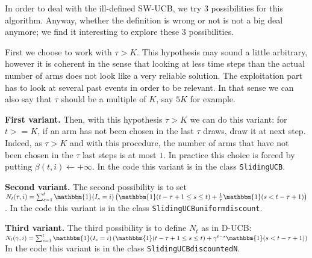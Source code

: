 In order to deal with the ill-defined SW-UCB, we try $3$ possibilities for this algorithm. Anyway, whether the definition is wrong or not is not a big deal anymore; we find it interesting to explore these $3$ possibilities.

First we choose to work with $\tau > K$. This hypothesis may sound a little arbitrary, however it is coherent in the sense that looking at less time steps than the actual number of arms does not look like a very reliable solution. The exploitation part has to look at several past events in order to be relevant. In that sense we can also say that $\tau$ should be a multiple of $K$, say $5K$ for example. 

\textbf{First variant.} Then, with this hypothesis $\tau > K$ we can do this variant: for $t >= K$, if an arm has not been chosen in the last $\tau$ draws, draw it at next step. Indeed, as $\tau > K$ and with this procedure, the number of arms that have not been chosen in the $\tau$ last steps is at most $1$. In practice this choice is forced by putting $\beta(t,i)\leftarrow+\infty$. In the code this variant is in the class \texttt{SlidingUCB}.

\textbf{Second variant.} The second possibility is to set \\
$N_t(\tau,i)=\sum_{s=1}^t \mathbbm{1}(I_s=i)
	\left(
		\mathbbm{1}(t-\tau+1 \leq s \leq t)
		+ \frac{1}{\tau} \mathbbm{1}(s < t-\tau+1)
	\right)$.
In the code this variant is in the class \texttt{SlidingUCB\textunderscore uniform\textunderscore discount}.

\textbf{Third variant.} The third possibility is to define $N_t$ as in D-UCB:\\
$N_t(\gamma, i) = \sum_{s=1}^t \mathbbm{1}(I_s=i)
	\left(
	\mathbbm{1}(t-\tau+1 \leq s \leq t)
	+ \gamma^{t-s}\mathbbm{1}(s < t-\tau+1)
	\right)$
In the code this variant is in the class \texttt{SlidingUCB\textunderscore discountedN}.